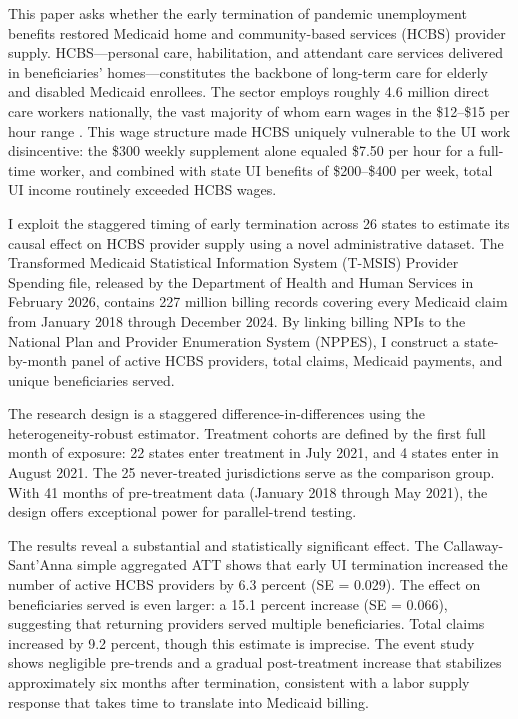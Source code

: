 \documentclass[12pt]{article}
\begin{document}
This paper asks whether the early termination of pandemic unemployment benefits restored Medicaid home and community-based services (HCBS) provider supply. HCBS---personal care, habilitation, and attendant care services delivered in beneficiaries' homes---constitutes the backbone of long-term care for elderly and disabled Medicaid enrollees. The sector employs roughly 4.6 million direct care workers nationally, the vast majority of whom earn wages in the \$12--\$15 per hour range \citep{phi2021}. This wage structure made HCBS uniquely vulnerable to the UI work disincentive: the \$300 weekly supplement alone equaled \$7.50 per hour for a full-time worker, and combined with state UI benefits of \$200--\$400 per week, total UI income routinely exceeded HCBS wages.

I exploit the staggered timing of early termination across 26 states to estimate its causal effect on HCBS provider supply using a novel administrative dataset. The Transformed Medicaid Statistical Information System (T-MSIS) Provider Spending file, released by the Department of Health and Human Services in February 2026, contains 227 million billing records covering every Medicaid claim from January 2018 through December 2024. By linking billing NPIs to the National Plan and Provider Enumeration System (NPPES), I construct a state-by-month panel of active HCBS providers, total claims, Medicaid payments, and unique beneficiaries served.

The research design is a staggered difference-in-differences using the \citet{callaway2021} heterogeneity-robust estimator. Treatment cohorts are defined by the first full month of exposure: 22 states enter treatment in July 2021, and 4 states enter in August 2021. The 25 never-treated jurisdictions serve as the comparison group. With 41 months of pre-treatment data (January 2018 through May 2021), the design offers exceptional power for parallel-trend testing.

The results reveal a substantial and statistically significant effect. The Callaway-Sant'Anna simple aggregated ATT shows that early UI termination increased the number of active HCBS providers by 6.3 percent (SE = 0.029). The effect on beneficiaries served is even larger: a 15.1 percent increase (SE = 0.066), suggesting that returning providers served multiple beneficiaries. Total claims increased by 9.2 percent, though this estimate is imprecise. The event study shows negligible pre-trends and a gradual post-treatment increase that stabilizes approximately six months after termination, consistent with a labor supply response that takes time to translate into Medicaid billing.
\end{document}
